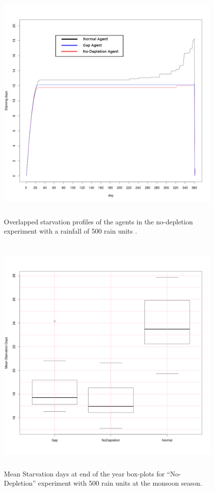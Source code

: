 \documentclass[11pt,oneside,a4paper,openright]{report}
\begin{document}


\begin{figure}[!htb]
\centering
\includegraphics[height=12.2cm]{figures/expm/gapExplainClimate500}
\caption{Overlapped starvation profiles of the agents in the no-depletion experiment with a rainfall of 500 
rain units .}
\label{fig:gapExplainClimate500}
\end{figure}


\begin{figure}[!htb]
\centering
\includegraphics[height=12.2cm]{figures/expm/gapBoxplotsClimate500}
\caption{Mean Starvation days at end of the year box-plots for ``No-Depletion'' experiment 
with 500 rain units at the monsoon season.}
\label{fig:gapBoxplotsClimate500}
\end{figure}
\end{document}
